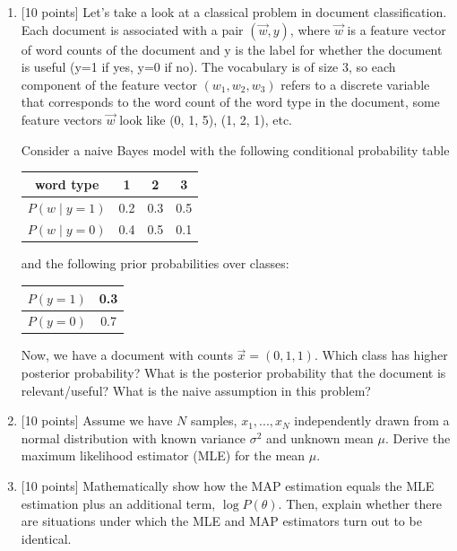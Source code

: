 \documentclass[letterpaper]{article}
\begin{document}
\begin{enumerate}

   \item {[10 points]} Let's take a look at a classical problem in document classification. Each document is associated with a pair $(\vec{w}, y)$, where $\vec{w}$ is a feature vector of word counts of the document and y is the label for whether the document is useful (y=1 if yes, y=0 if no). The vocabulary is of size 3, so each component of the feature vector $(w_1, w_2, w_3)$ refers to a discrete variable that corresponds to the word count of the word type in the document, some feature vectors $\vec{w}$ look like (0, 1, 5), (1, 2, 1), etc. 
  
Consider a naive Bayes model with the following conditional probability table
\begin{table}[!htbp]
\centering
\begin{tabular}{|c|c|c|c|}
\hline
word type         & 1   & 2   & 3    \\
\hline
$P(w \mid y = 1)$ & 0.2 & 0.3 & 0.5 \\
\hline
$P(w \mid y = 0)$ & 0.4 & 0.5 & 0.1  \\
\hline
\end{tabular}
\end{table}

and the following prior probabilities over classes:
\begin{table}[!htbp]
\centering
\begin{tabular}{|c|c|}
\hline
$P(y=1)$ & 0.3   \\
\hline
$P(y=0)$ & 0.7  \\
\hline
\end{tabular}
\end{table}

Now, we have a document with counts $\vec{x} = (0, 1, 1)$. Which class has higher posterior probability? What is the posterior probability that the document is relevant/useful? What is the naive assumption in this problem?
   
 
  \item {[10 points]} Assume we have $N$ samples, $x_{1},...,x_{N}$ independently drawn from a normal distribution with known variance $\sigma^{2}$ and unknown mean $\mu$. Derive the maximum likelihood estimator (MLE) for the mean $\mu$.

 
  \item {[10 points]} Mathematically show how the MAP estimation equals the MLE estimation plus an additional term, $\log P(\theta)$. Then, explain whether there are situations under which the MLE and MAP estimators turn out to be identical.
  
  
\end{enumerate}
\end{document}
